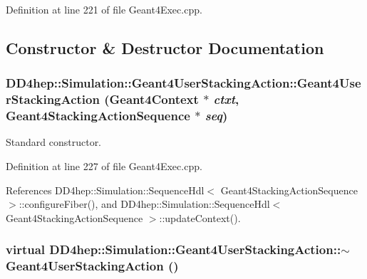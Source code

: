 Definition at line 221 of file Geant4Exec.cpp.

\subsection{Constructor \& Destructor Documentation}
\hypertarget{class_d_d4hep_1_1_simulation_1_1_geant4_user_stacking_action_a34c062c0fa5934878f532ef10f9c96d5}{
\subsubsection[{Geant4UserStackingAction}]{\setlength{\rightskip}{0pt plus 5cm}DD4hep::Simulation::Geant4UserStackingAction::Geant4UserStackingAction ({\bf Geant4Context} $\ast$ {\em ctxt}, \/  {\bf Geant4StackingActionSequence} $\ast$ {\em seq})}}
\label{class_d_d4hep_1_1_simulation_1_1_geant4_user_stacking_action_a34c062c0fa5934878f532ef10f9c96d5}


Standard constructor. 

Definition at line 227 of file Geant4Exec.cpp.

References DD4hep::Simulation::SequenceHdl$<$ Geant4StackingActionSequence $>$::configureFiber(), and DD4hep::Simulation::SequenceHdl$<$ Geant4StackingActionSequence $>$::updateContext().\hypertarget{class_d_d4hep_1_1_simulation_1_1_geant4_user_stacking_action_a023f102d73420bfab08e6a866ea03dc7}{
\subsubsection[{$\sim$Geant4UserStackingAction}]{\setlength{\rightskip}{0pt plus 5cm}virtual DD4hep::Simulation::Geant4UserStackingAction::$\sim$Geant4UserStackingAction ()}}
\label{class_d_d4hep_1_1_simulation_1_1_geant4_user_stacking_action_a023f102d73420bfab08e6a866ea03dc7}



